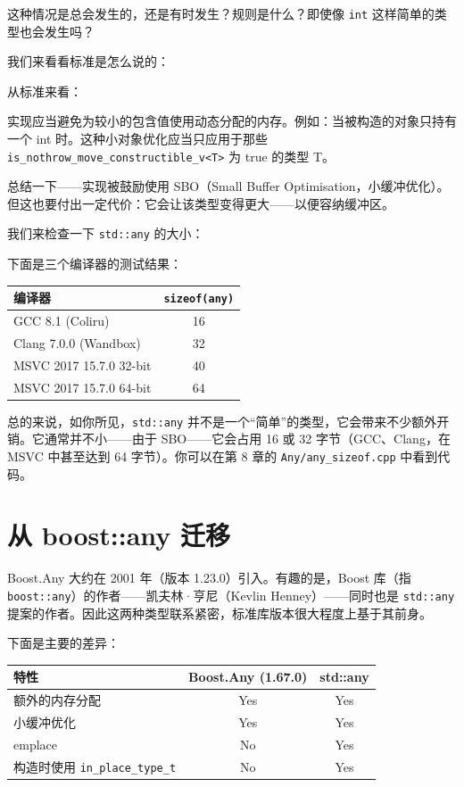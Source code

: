 这种情况是总会发生的，还是有时发生？规则是什么？即使像 \texttt{int} 这样简单的类型也会发生吗？

我们来看看标准是怎么说的：

从标准来看：

\begin{myQuote}
实现应当避免为较小的包含值使用动态分配的内存。例如：当被构造的对象只持有一个 int 时。这种小对象优化应当只应用于那些 \texttt{is\_nothrow\_move\_constructible\_v<T>} 为 true 的类型 T。
\end{myQuote}

总结一下——实现被鼓励使用 SBO（Small Buffer Optimisation，小缓冲优化）。但这也要付出一定代价：它会让该类型变得更大——以便容纳缓冲区。

我们来检查一下 \texttt{std::any} 的大小：

下面是三个编译器的测试结果：

\begin{table}[H]
\centering
\begin{tabularx}{\textwidth}{X c}
\toprule
编译器 & \texttt{sizeof(any)} \\
\midrule
GCC 8.1 (Coliru) & 16 \\
Clang 7.0.0 (Wandbox) & 32 \\
MSVC 2017 15.7.0 32-bit & 40 \\
MSVC 2017 15.7.0 64-bit & 64 \\
\bottomrule
\end{tabularx}
\end{table}

总的来说，如你所见，\texttt{std::any} 并不是一个“简单”的类型，它会带来不少额外开销。它通常并不小——由于 SBO——它会占用 16 或 32 字节（GCC、Clang，在 MSVC 中甚至达到 64 字节）。你可以在第 8 章的 \texttt{Any/any\_sizeof.cpp} 中看到代码。


\section{从 boost::any 迁移}

Boost.Any 大约在 2001 年（版本 1.23.0）引入。有趣的是，Boost 库（指 \texttt{boost::any}）的作者——凯夫林·亨尼（Kevlin Henney）——同时也是 \texttt{std::any} 提案的作者。因此这两种类型联系紧密，标准库版本很大程度上基于其前身。

下面是主要的差异：

\begin{table}[H]
\centering
\begin{tabularx}{\textwidth}{X c c}
\toprule
特性 & Boost.Any (1.67.0) & std::any \\
\midrule
额外的内存分配 & Yes & Yes \\
小缓冲优化 & Yes & Yes \\
emplace & No & Yes \\
构造时使用 \texttt{in\_place\_type\_t} & No & Yes \\
\bottomrule
\end{tabularx}
\end{table}


